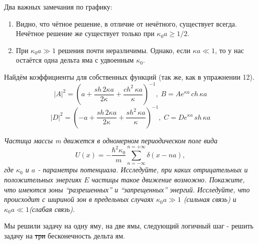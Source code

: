 Два важных замечания по графику:
\begin{enumerate}
    \item Видно, что чётное решение, в отличие от нечётного, существует всегда. Нечётное решение же существует только при $\kappa_0a\geq 1/2$.
    \item При $\kappa_0a\gg 1$ решения почти неразличимы. Однако, если $\kappa a \ll 1$, то у нас остаётся одна дельта яма с удвоенным $\kappa_0$.
\end{enumerate}
Найдём коэффициенты для собственных функций (так же, как в упражнении 12).
\[
|A|^2 =  (a + \frac{sh\, 2\kappa a}{2\kappa} + \frac{ch ^2\,\kappa a}{\kappa})^{-1},\; B = Ae^{\kappa a}\,ch\,\kappa a
\]
\[
|D|^2 = (-a + \frac{sh\, 2\kappa a}{2\kappa} + \frac{sh ^2\,\kappa a}{\kappa})^{-1},\;C = De^{\kappa a}\,sh\,\kappa a
\]

\begin{center}
    \textit{Частица массы m движется в одномерном периодическом поле вида}
    \[
    U(x) = -\frac{\hbar^2\kappa_0}{m}\sum\limits_{n=-\infty}^{n = +\infty}\delta(x-na),
    \]
    \textit{где $\kappa_0$ и $a$ - параметры потенциала. Исследуйте, при каких отрицательных и положительных энергиях $E$ частицы такое движение возможно. Покажите, что имеются зоны ``разрешенных'' и ``запрещенных'' энергий.}
    \textit{Исследуйте, что происходит с шириной зон в предельных случаях $\kappa_0a\gg1$ (сильная связь) и $\kappa_0a\ll1$(слабая связь).}
    
\end{center}

Мы решили задачу на одну яму, на две ямы, следующий логичный шаг - решить задачу на \sout{три} бесконечность дельта ям.

